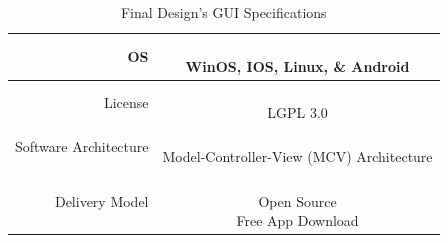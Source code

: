 \documentclass[12pt]{article}
\begin{document}
\begin{table}[h!]
\centering
\caption{Final Design's GUI Specifications}
\begin{tabular} {| r | c | }
\hline
\parbox{0.3\linewidth}{\raggedleft
OS
} &   \parbox{0.65\linewidth}{\hfill \\
WinOS, IOS, Linux, \& Android
}\\
\hline
\parbox{0.3\linewidth}{\raggedleft
License
} &   \parbox{0.65\linewidth}{\hfill \\
 LGPL 3.0
}\\
\hline
\parbox{0.3\linewidth}{\raggedleft
Software Architecture
} &   \parbox{0.65\linewidth}{\hfill \\
Model-Controller-View (MCV) Architecture
}\\
\hline
\hline
\parbox{0.3\linewidth}{\raggedleft
Delivery Model 
} &   \parbox{0.65\linewidth}{\hfill \\
Open Source\\
Free App Download
}\\
\hline
%
%
\end{tabular}
\end{table}
\hfill \\
\end{document}

